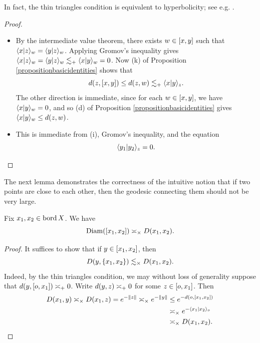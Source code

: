 \noindent In fact, the thin triangles condition is equivalent to hyperbolicity; see e.g. \cite[Proposition III.H.1.22]{BridsonHaefliger}.
\begin{proof}~
\begin{itemize}
\item[(i)] By the intermediate value theorem, there exists $w\in[x,y]$ such that $\langle x|z\rangle_w = \langle y|z\rangle_w$. Applying Gromov's inequality gives $\langle x|z\rangle_w = \langle y|z\rangle_w \lesssim_+ \langle x|y\rangle_w = 0$. Now (k) of Proposition \ref{propositionbasicidentities} shows that 
\[
d(z,[x,y]) \leq d(z,w) \lesssim_+ \langle x|y\rangle_z.
\] 
The other direction is immediate, since for each $w\in[x,y]$, we have $\langle x|y\rangle_w = 0$, and so (d) of Proposition \ref{propositionbasicidentities} gives $\langle x|y\rangle_w \leq d(z,w)$.
\item[(ii)] This is immediate from (i), Gromov's inequality, and the equation 
\[
\langle y_1|y_2\rangle_z = 0.
\]
\end{itemize}
\end{proof}

The next lemma demonstrates the correctness of the intuitive notion that if two points are close to each other, then the geodesic connecting them should not be very large.

\begin{lemma}
\label{lemmageodesicdiameter}
Fix $x_1,x_2\in \operatorname{bord} X$. We have
\[
\operatorname{Diam}([x_1,x_2]) \asymp_\times D(x_1,x_2).
\]
\end{lemma}
\begin{proof}
It suffices to show that if $y\in[x_1,x_2]$, then
\[
D(y,\{x_1,x_2\}) \lesssim_\times D(x_1,x_2).
\]
Indeed, by the thin triangles condition, we may without loss of generality suppose that $d(y, [o,x_1]) \asymp_+ 0$. Write $d(y,z) \asymp_+ 0$ for some $z\in [o,x_1]$. Then
\begin{align*}
D(x_1,y) \asymp_\times D(x_1,z) = e^{-\|z\|} \asymp_\times e^{-\|y\|} 
&\leq e^{-d(o,[x_1,x_2])}\\ 
&\asymp_\times e^{-\langle x_1|x_2\rangle_o}\\
&\asymp_\times D(x_1,x_2).
\end{align*}
\end{proof}


%
%



